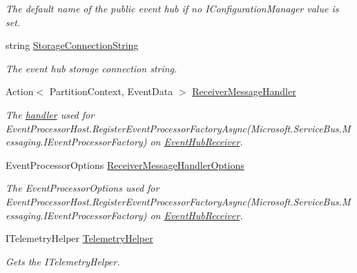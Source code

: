 \begin{DoxyCompactItemize}
\begin{DoxyCompactList}\small\item\em The default name of the public event hub if no I\+Configuration\+Manager value is set. \end{DoxyCompactList}\item 
string \hyperlink{classCqrs_1_1Azure_1_1ServiceBus_1_1AzureEventHub_a2b102538e8b72f9990578fa3bcbe4c12_a2b102538e8b72f9990578fa3bcbe4c12}{Storage\+Connection\+String}
\begin{DoxyCompactList}\small\item\em The event hub storage connection string. \end{DoxyCompactList}\item 
Action$<$ Partition\+Context, Event\+Data $>$ \hyperlink{classCqrs_1_1Azure_1_1ServiceBus_1_1AzureEventHub_a8c9faa7096d72a45803e6e63a1b3cf30_a8c9faa7096d72a45803e6e63a1b3cf30}{Receiver\+Message\+Handler}
\begin{DoxyCompactList}\small\item\em The \hyperlink{}{handler} used for Event\+Processor\+Host.\+Register\+Event\+Processor\+Factory\+Async(\+Microsoft.\+Service\+Bus.\+Messaging.\+I\+Event\+Processor\+Factory) on \hyperlink{classCqrs_1_1Azure_1_1ServiceBus_1_1AzureEventHub_a1b12b47dbb9b9afe2014477a2e457c35_a1b12b47dbb9b9afe2014477a2e457c35}{Event\+Hub\+Receiver}. \end{DoxyCompactList}\item 
Event\+Processor\+Options \hyperlink{classCqrs_1_1Azure_1_1ServiceBus_1_1AzureEventHub_ad3a0c2f32d5771fb1f4420fc33c75968_ad3a0c2f32d5771fb1f4420fc33c75968}{Receiver\+Message\+Handler\+Options}
\begin{DoxyCompactList}\small\item\em The Event\+Processor\+Options used for Event\+Processor\+Host.\+Register\+Event\+Processor\+Factory\+Async(\+Microsoft.\+Service\+Bus.\+Messaging.\+I\+Event\+Processor\+Factory) on \hyperlink{classCqrs_1_1Azure_1_1ServiceBus_1_1AzureEventHub_a1b12b47dbb9b9afe2014477a2e457c35_a1b12b47dbb9b9afe2014477a2e457c35}{Event\+Hub\+Receiver}. \end{DoxyCompactList}\item 
I\+Telemetry\+Helper \hyperlink{classCqrs_1_1Azure_1_1ServiceBus_1_1AzureEventHub_a4cf19edac088c5ea74408398b3dfd4a2_a4cf19edac088c5ea74408398b3dfd4a2}{Telemetry\+Helper}
\begin{DoxyCompactList}\small\item\em Gets the I\+Telemetry\+Helper. \end{DoxyCompactList}\end{DoxyCompactItemize}


